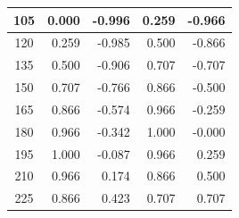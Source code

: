 \begin{table}[htbp]
\begin{center}
\begin{tabular}{|p{20mm}|p{20mm}|p{20mm}|p{20mm}|p{20mm}|}
            \multicolumn{1}{|c|}{105}                  & \multicolumn{1}{|r|}{0.000}                                  & \multicolumn{1}{|r|}{-0.996}                                 & \multicolumn{1}{|r|}{0.259}                & \multicolumn{1}{|r|}{-0.966}               \\ \hline
            \multicolumn{1}{|c|}{120}                  & \multicolumn{1}{|r|}{0.259}                                  & \multicolumn{1}{|r|}{-0.985}                                 & \multicolumn{1}{|r|}{0.500}                & \multicolumn{1}{|r|}{-0.866}               \\ \hline
            \multicolumn{1}{|c|}{135}                  & \multicolumn{1}{|r|}{0.500}                                  & \multicolumn{1}{|r|}{-0.906}                                 & \multicolumn{1}{|r|}{0.707}                & \multicolumn{1}{|r|}{-0.707}               \\ \hline
            \multicolumn{1}{|c|}{150}                  & \multicolumn{1}{|r|}{0.707}                                  & \multicolumn{1}{|r|}{-0.766}                                 & \multicolumn{1}{|r|}{0.866}                & \multicolumn{1}{|r|}{-0.500}               \\ \hline
            \multicolumn{1}{|c|}{165}                  & \multicolumn{1}{|r|}{0.866}                                  & \multicolumn{1}{|r|}{-0.574}                                 & \multicolumn{1}{|r|}{0.966}                & \multicolumn{1}{|r|}{-0.259}               \\ \hline
            \multicolumn{1}{|c|}{180}                  & \multicolumn{1}{|r|}{0.966}                                  & \multicolumn{1}{|r|}{-0.342}                                 & \multicolumn{1}{|r|}{1.000}                & \multicolumn{1}{|r|}{-0.000}               \\ \hline
            \multicolumn{1}{|c|}{195}                  & \multicolumn{1}{|r|}{1.000}                                  & \multicolumn{1}{|r|}{-0.087}                                 & \multicolumn{1}{|r|}{0.966}                & \multicolumn{1}{|r|}{0.259}                \\ \hline
            \multicolumn{1}{|c|}{210}                  & \multicolumn{1}{|r|}{0.966}                                  & \multicolumn{1}{|r|}{0.174}                                  & \multicolumn{1}{|r|}{0.866}                & \multicolumn{1}{|r|}{0.500}                \\ \hline
            \multicolumn{1}{|c|}{225}                  & \multicolumn{1}{|r|}{0.866}                                  & \multicolumn{1}{|r|}{0.423}                                  & \multicolumn{1}{|r|}{0.707}                & \multicolumn{1}{|r|}{0.707}                \\ \hline

\end{tabular}
\end{center}
\end{table}
